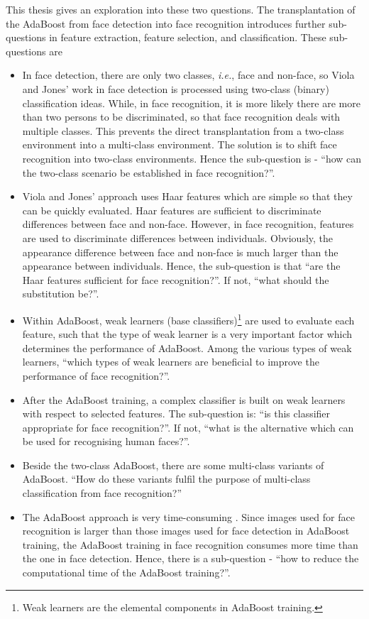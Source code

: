 This thesis gives an exploration into these two questions. The transplantation of the AdaBoost from face detection into face recognition introduces further sub-questions in feature extraction, feature selection, and classification. These sub-questions are
\begin{itemize}
	\item In face detection, there are only two classes, \textit{i.e.}, face and non-face, so Viola and Jones' work in face detection \cite{Viola2001} is processed using two-class (binary) classification ideas. While, in face recognition, it is more likely there are more than two persons to be discriminated, so that face recognition deals with multiple classes. This prevents the direct transplantation from a two-class environment into a multi-class environment. The solution is to shift face recognition into two-class environments. Hence the sub-question is - ``how can the two-class scenario be established in face recognition?''.
	\item Viola and Jones' approach uses Haar features which are simple so that they can be quickly evaluated. Haar features are sufficient to discriminate differences between face and non-face. However, in face recognition, features are used to discriminate differences between individuals. Obviously, the appearance difference between face and non-face is much larger than the appearance between individuals. Hence, the sub-question is that ``are the Haar features sufficient for face recognition?''. If not, ``what should the substitution be?''.
	\item Within AdaBoost, weak learners (base classifiers)\footnote{Weak learners are the elemental components in AdaBoost training.} are used to evaluate each feature, such that the type of weak learner is a very important factor which determines the performance of AdaBoost. Among the various types of weak learners, ``which types of weak learners are beneficial to improve the performance of face recognition?''.
	\item After the AdaBoost training, a complex classifier is built on weak learners with respect to selected features. The sub-question is: ``is this classifier appropriate for face recognition?''. If not, ``what is the alternative which can be used for recognising human faces?''.
	\item Beside the two-class AdaBoost, there are some multi-class variants of AdaBoost. ``How do these variants fulfil the purpose of multi-class classification from face recognition?''
	\item The AdaBoost approach is very time-consuming \cite{Young2005}. Since images used for face recognition is larger than those images used for face detection in AdaBoost training, the AdaBoost training in face recognition consumes more time than the one in face detection. Hence, there is a sub-question - ``how to reduce the computational time of the AdaBoost training?''.
\end{itemize}

